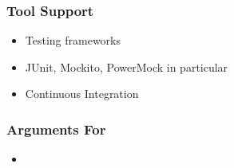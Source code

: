 \documentclass{beamer}
\begin{document}
\begin{frame}
\frametitle{Tool Support}
\begin{itemize}
	\item Testing frameworks
	\item JUnit, Mockito, PowerMock in particular
	\item Continuous Integration
\end{itemize}
\end{frame}

\begin{frame}
\frametitle{Arguments For}
\begin{itemize}
	\item 
\end{itemize}
\end{frame}
\end{document}
